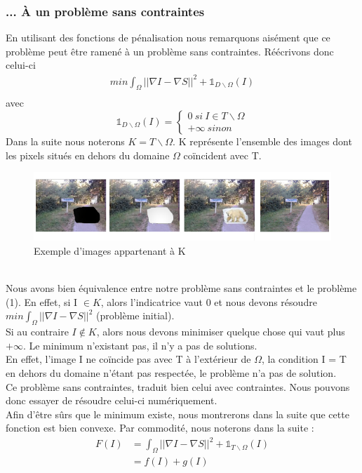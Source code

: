 \subsubsection{... À un problème sans contraintes}
En utilisant des fonctions de pénalisation nous remarquons aisément que ce problème peut être ramené à un problème sans contraintes. Réécrivons donc celui-ci 
\begin{equation*}
\begin{aligned}{}
    min \int_\Omega ||\nabla I - \nabla S||^2 + \mathbb{1} _{D \backslash \Omega } (I) \\
    \end{aligned}
\end{equation*}{}
avec 
\begin{equation*}
\mathbb{1}_{ D \backslash \Omega }(I) =
	\left\{
	\begin{aligned}{}
	0 \ si\  I \in T \backslash \Omega \\
	+ \infty \ sinon
    \end{aligned}
    \right.
\end{equation*}{}
Dans la suite nous noterons $K = T\backslash \Omega$. K représente l'ensemble des images dont les pixels situés en dehors du domaine $\Omega$ coïncident avec T.\\
\begin{figure}[!h]
\centering
\includegraphics[scale=0.5]{Images/K.png}
\caption{Exemple d'images appartenant à K}
\end{figure}
\\
Nous avons bien équivalence entre notre problème sans contraintes et le problème (1). En effet, si I $\in K$, alors l'indicatrice vaut 0 et nous devons résoudre $min \int_\Omega ||\nabla I - \nabla S||^2 $ (problème initial). \\
Si au contraire $I \notin K$, alors nous devons minimiser quelque chose qui vaut plus $+\infty$. Le minimum n'existant pas, il n'y a pas de solutions.\\
En effet, l'image I ne coïncide pas avec T à l'extérieur de $\Omega$,  la condition I = T en dehors du domaine n'étant pas respectée, le problème n'a pas de solution. \\
 Ce problème sans contraintes, traduit bien celui avec contraintes. Nous pouvons donc essayer de résoudre celui-ci numériquement.\\ Afin d'être sûrs que le minimum existe, nous montrerons dans la suite que cette fonction est bien convexe. 
 Par commodité, nous noterons dans la suite : 
 \begin{equation*}
 \begin{aligned}
 F(I) &=   \int_\Omega ||\nabla I - \nabla S||^2 + \mathbb{1} _{T\backslash \Omega } (I) \\
 & = f(I)+ g(I)
 \end{aligned}
 \end{equation*}

